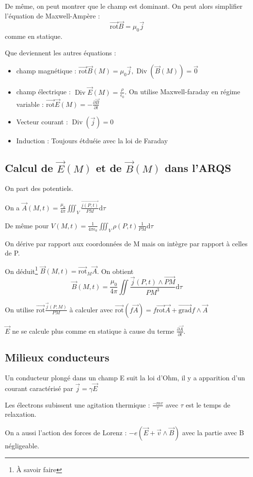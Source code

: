 \documentclass[french]{yLectureNote}
\renewcommand{\vec}{\overrightarrow}
\newcommand{\dd}{\mathrm{d}}
\newcommand{\E}{\vec{E}(M)}
\newcommand{\B}{\vec{B}(M)}
\DeclareMathOperator{\Div}{Div}
\newcommand{\rot}{\vec{\mathrm{rot}}}
\newcommand{\grad}{\vec{\mathrm{grad}}}
\begin{document}
De m\^eme, on peut montrer que le champ est dominant. On peut alors simplifier l'équation de Maxwell-Ampère : 
$$\rot{\vec{B}} = \mu_0\vec{j}$$ comme en statique.

Que deviennent les autres équations : 
\begin{itemize}
    \item champ magnétique : $\rot{\B} = \mu_0 \vec{j}, \Div(\B) = \vec{0}$
    \item champ électrique : $\Div\E = \frac{\rho}{\epsilon_0}$. On utilise Maxwell-faraday en régime variable : $\rot{\E} = -\frac{\partial \vec{B}}{\partial t}$
    \item Vecteur courant : $\Div(\vec{j}) = 0$
    \item Induction  : Toujours étduéie avec la loi de Faraday
\end{itemize}
\subsection{Calcul de $\E$ et de $\B$ dans l'ARQS}
On part des potentiels.

On a $\vec{A}(M,t) = \frac{\mu_0}{4\pi}\iiint_V \frac{\vec{j(P,t)}}{PM}\dd \tau$

De m\^eme pour $V (M,t) = \frac{1}{4\pi\epsilon_0}\iiint_V \rho(P,t)\frac{1}{PM}\dd \tau$

On dérive par rapport aux coordonnées de M mais on intègre par rapport à celles de P.

On déduit\footnote{À savoir faire} $\vec{B}(M,t) = \rot_M\vec{A}$. On obtient $$\vec{B}(M,t) = \frac{\mu_0}{4\pi}\iint \frac{\vec{j}(P,t)\wedge \vec{PM}}{PM^3}\dd \tau$$

On utilise $\rot \frac{\vec{j}(P,M)}{PM}$ à calculer avec $\rot(f\vec{A}) = f\rot\vec{A}+\grad f \wedge \vec{A}$

$\vec{E}$ ne se calcule plus comme en statique à cause du terme $\frac{\partial \vec{A}}{\partial t}$.

\subsection{Milieux conducteurs}
Un conducteur plongé dans un champ E suit la loi d'Ohm, il y a apparition d'un courant caractérisé par $\vec{j} = \gamma \vec{E}$

Les électrons subissent une agitation thermique : $\frac{-mv}{\tau}$ avec $\tau$ est le temps de relaxation.

On a aussi l'action des forces de Lorenz : $-e(\vec{E}+\vec{v}\wedge \vec{B})$ avec la partie avec B négligeable.
\end{document}
